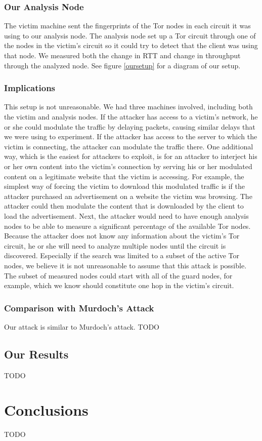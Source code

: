 \documentclass[12pt,journal]{IEEEtran}
\begin{document}
\subsubsection{Our Analysis Node}The victim machine sent the fingerprints of the Tor nodes in each circuit it was using to our analysis node. The analysis node set up a Tor circuit through one of the nodes in the victim's circuit so it could try to detect that the client was using that node. We measured both the change in RTT and change in throughput through the analyzed node. See figure \ref{oursetup} for a diagram of our setup.
\subsubsection{Implications}
This setup is not unreasonable. We had three machines involved, including both the victim and analysis nodes. If the attacker has access to a victim's network, he or she could modulate the traffic by delaying packets, causing similar delays that we were using to experiment. If the attacker has access to the server to which the victim is connecting, the attacker can modulate the traffic there.
One additional way, which is the easiest for attackers to exploit, is for an attacker to interject his or her own content into the victim's connection by serving his or her modulated content on a legitimate website that the victim is accessing. For example, the simplest way of forcing the victim to download this modulated traffic is if the attacker purchased an advertisement on a website the victim was browsing. The attacker could then modulate the content that is downloaded by the client to load the advertisement.
Next, the attacker would need to have enough analysis nodes to be able to measure a significant percentage of the available Tor nodes. Because the attacker does not know any information about the victim's Tor circuit, he or she will need to analyze multiple nodes until the circuit is discovered. Especially if the search was limited to a subset of the active Tor nodes, we believe it is not unreasonable to assume that this attack is possible. The subset of measured nodes could start with all of the guard nodes, for example, which we know should constitute one hop in the victim's circuit.
\subsubsection{Comparison with Murdoch's Attack}
Our attack is similar to Murdoch's attack. TODO
\subsection{Our Results}
TODO
\section{Conclusions}
TODO
\printbibliography
\end{document}
